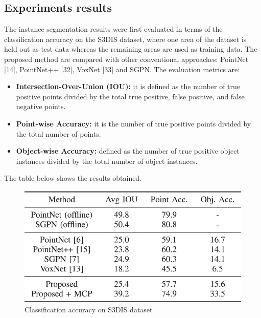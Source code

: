 \subsection{Experiments results}\label{header-n935}

The instance segmentation results were first evaluated in terms of the
classification accuracy on the S3DIS dataset, where one area of the
dataset is held out as test data whereas the remaining areas are used as
training data. The proposed method are compared with other conventional
approaches: PointNet {[}14{]}, PointNet++ {[}32{]}, VoxNet {[}33{]} and
SGPN. The evaluation metrics are:

\begin{itemize}
\item
  \textbf{Intersection-Over-Union (IOU):} it is defined as the number of
  true positive points divided by the total true positive, false
  positive, and false negative points.
\item
  \textbf{Point-wise Accuracy:} it is the number of true positive points
  divided by the total number of points.
\item
  \textbf{Object-wise Accuracy:} defined as the number of true positive
  object instances divided by the total number of object instances.
\end{itemize}

The table below shows the results obtained.

\begin{figure}[h!]
\centering
\includegraphics[width=0.7\linewidth]{images/segresultsaccu.png}
\caption{Classification accuracy on S3DIS dataset}
\end{figure}

